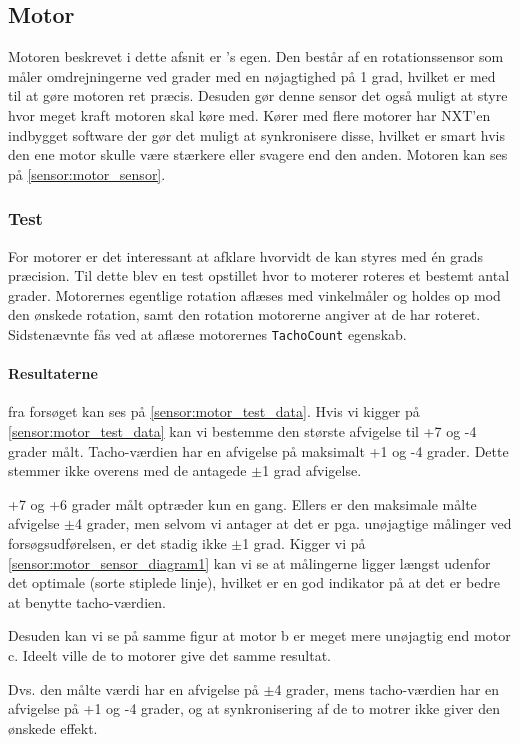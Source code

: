 \subsection{Motor}
Motoren beskrevet i dette afsnit er \lego's egen.
Den består af en rotationssensor som måler omdrejningerne ved grader med en nøjagtighed på 1 grad, hvilket er med til at gøre motoren ret præcis. 
Desuden gør denne sensor det også muligt at styre hvor meget kraft motoren skal køre med.
Kører med flere motorer har NXT'en indbygget software der gør det muligt at synkronisere disse, hvilket er smart hvis den ene motor skulle være stærkere eller svagere end den anden.\cite{tikNXT}
Motoren kan ses på \cref{sensor:motor_sensor}.

\subsubsection{Test}
For \legos motorer er det interessant at afklare hvorvidt de kan styres med \'en grads præcision.
Til dette blev en test opstillet hvor to moterer roteres et bestemt antal grader.
Motorernes egentlige rotation aflæses med vinkelmåler og holdes op mod den ønskede rotation, samt den rotation motorerne angiver at de har roteret.
Sidstenævnte fås ved at aflæse motorernes \lstinline[style=csharp]!TachoCount! egenskab.

\paragraph{Resultaterne} fra forsøget kan ses på \cref{sensor:motor_test_data}.
Hvis vi kigger på \cref{sensor:motor_test_data} kan vi bestemme den største afvigelse til +7 og -4 grader målt.
Tacho-værdien har en afvigelse på maksimalt +1 og -4 grader.
Dette stemmer ikke overens med de antagede $\pm$1 grad afvigelse.

+7 og +6 grader målt optræder kun en gang.
Ellers er den maksimale målte afvigelse $\pm$4 grader, men selvom vi antager at det er pga. unøjagtige målinger ved forsøgsudførelsen, er det stadig ikke $\pm$1 grad.
Kigger vi på \cref{sensor:motor_sensor_diagram1} kan vi se at målingerne ligger længst udenfor det optimale (sorte stiplede linje), hvilket er en god indikator på at det er bedre at benytte tacho-værdien.

Desuden kan vi se på samme figur at motor b er meget mere unøjagtig end motor c.
Ideelt ville de to motorer give det samme resultat.

Dvs. den målte værdi har en afvigelse på $\pm$4 grader, mens tacho-værdien har en afvigelse på +1 og -4 grader, og at synkronisering af de to motrer ikke giver den ønskede effekt.
